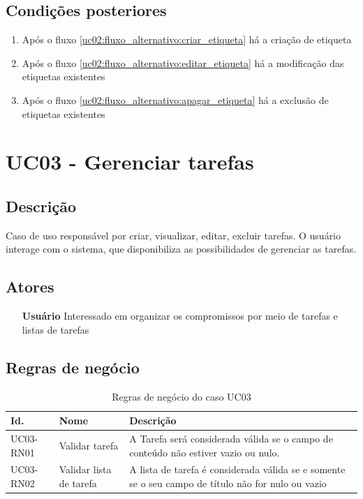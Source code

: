 \documentclass[
	12pt,				%
	oneside,			%
	a4paper,			%
	english,			%
	brazil,				%
	]{abntex2}
\begin{document}
\section{Condições posteriores}
\begin{enumerate}
    \item Após o fluxo \ref{uc02:fluxo_alternativo:criar_etiqueta} há a criação de etiqueta
    \item Após o fluxo \ref{uc02:fluxo_alternativo:editar_etiqueta} há a modificação das etiquetas existentes
    \item Após o fluxo \ref{uc02:fluxo_alternativo:apagar_etiqueta} há a exclusão de etiquetas existentes
\end{enumerate}


\chapter{UC03 - Gerenciar tarefas}
\section{Descrição} 
Caso de uso responsável por criar, visualizar, editar, excluir tarefas. O usuário interage com o sistema, que disponibiliza as possibilidades de gerenciar as tarefas.
\section{Atores}
\begin{itemize}
    \item[\textbf{Usuário}] Interessado em organizar os compromissos por meio de tarefas e listas de tarefas
\end{itemize}

\section{Regras de negócio}
\IBGEtabfontsize
\begin{longtable}{@{}lp{}p{}@{}}
\caption{Regras de negócio do caso UC03}
\label{tab:uc03:regras_de_negocio} \\
\toprule
\textbf{Id.} & \textbf{Nome} & \textbf{Descrição} \\ \midrule
UC03-RN01 & Validar tarefa & A Tarefa será considerada válida se o campo de conteúdo não estiver vazio ou nulo.   \label{uc03:rn01_validar_tarefa} \\ \midrule
UC03-RN02 & Validar lista de tarefa & A lista de tarefa é considerada válida se e somente se o seu campo de título não for nulo ou vazio  \label{uc03:rn02_validar_lista_tarefa} \\ \bottomrule
\end{longtable}
\end{document}
